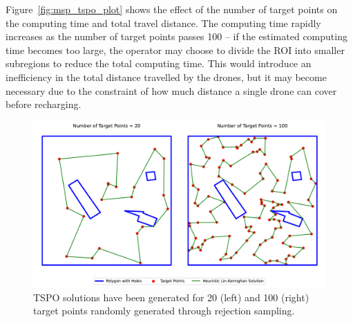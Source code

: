 Figure~\ref{fig:msp_tspo_plot} shows the effect of the number of target points on the computing time and total travel distance. The computing time rapidly increases as the number of target points passes 100 -- if the estimated computing time becomes too large, the operator may choose to divide the \gls{ROI} into smaller subregions to reduce the total computing time. This would introduce an inefficiency in the total distance travelled by the drones, but it may become necessary due to the constraint of how much distance a single drone can cover before recharging. 


\begin{figure}[h!]
    \centering
    \includegraphics[width=\linewidth]{figs/Jihwan/TSPO_diff_targets.pdf}
    \caption[TSP-O Solution for Different Numbers of Target Points]
    {\gls{TSPO} solutions have been generated for 20 (left) and 100 (right) target points randomly generated through rejection sampling.}
    \label{fig:msp_tspo_20_100}
\end{figure}

